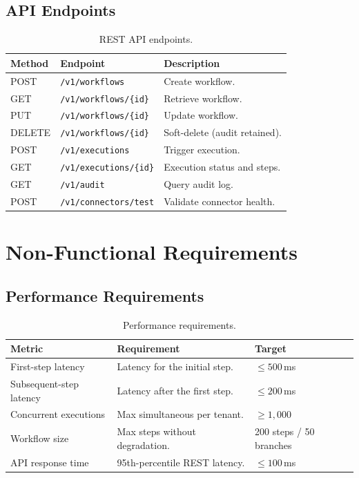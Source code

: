 \documentclass[
    language=english,
    doctype=article,
    institution=none,
]{../../omnilatex}
\begin{document}
\subsection{API Endpoints}

\begin{table}[htbp]
\centering\small
\begin{tabular}{@{}llp{5cm}@{}}
    \toprule
    \textbf{Method} & \textbf{Endpoint} & \textbf{Description} \\
    \midrule
    POST   & \texttt{/v1/workflows}         & Create workflow. \\
    GET    & \texttt{/v1/workflows/\{id\}}   & Retrieve workflow. \\
    PUT    & \texttt{/v1/workflows/\{id\}}   & Update workflow. \\
    DELETE & \texttt{/v1/workflows/\{id\}}   & Soft-delete (audit
        retained). \\
    POST   & \texttt{/v1/executions}         & Trigger execution. \\
    GET    & \texttt{/v1/executions/\{id\}}  & Execution status and
        steps. \\
    GET    & \texttt{/v1/audit}              & Query audit log. \\
    POST   & \texttt{/v1/connectors/test}    & Validate connector
        health. \\
    \bottomrule
\end{tabular}
\caption{REST API endpoints.}
\label{tab:api-endpoints}
\end{table}

\section{Non-Functional Requirements}

\subsection{Performance Requirements}

\begin{table}[htbp]
\centering\small
\begin{tabular}{@{}lp{5cm}l@{}}
    \toprule
    \textbf{Metric} & \textbf{Requirement} & \textbf{Target} \\
    \midrule
    First-step latency      & Latency for the initial step. &
        $\leq 500$\,ms \\
    Subsequent-step latency & Latency after the first step. &
        $\leq 200$\,ms \\
    Concurrent executions   & Max simultaneous per tenant. &
        $\geq 1{,}000$ \\
    Workflow size           & Max steps without degradation. &
        200 steps / 50 branches \\
    API response time       & 95th-percentile REST latency. &
        $\leq 100$\,ms \\
    \bottomrule
\end{tabular}
\caption{Performance requirements.}
\label{tab:perf-req}
\end{table}
\end{document}
